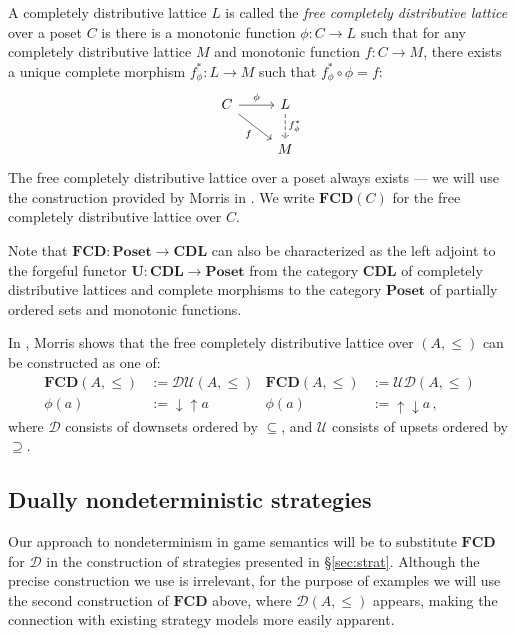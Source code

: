 \documentclass[format=sigplan,authordraft]{acmart}
\begin{document}
A completely distributive lattice $L$ is called the
\emph{free completely distributive lattice}
over a poset $C$ is there is
a monotonic function $\phi : C \rightarrow L$
such that
for any completely distributive lattice $M$
and monotonic function $f : C \rightarrow M$,
there exists a unique complete morphism $f^*_\phi : L \rightarrow M$
such that $f^*_\phi \circ \phi = f$:
\[
  \begin{tikzcd}
    C \arrow[r, "\phi"] \arrow[rd, "f"'] &
    L \arrow[d, "f^*_\phi", dashed] \\ & M
  \end{tikzcd}
\]
The free completely distributive lattice over a poset
always exists ---
we will use the construction provided by
Morris in \cite{augtyp}.
We write $\mathbf{FCD}(C)$ for
the free completely distributive lattice over $C$.

Note that $\mathbf{FCD} : \mathbf{Poset} \rightarrow \mathbf{CDL}$
can also be characterized as
the left adjoint to the forgeful functor
$\mathbf{U} : \mathbf{CDL} \rightarrow \mathbf{Poset}$
from the category $\mathbf{CDL}$
of completely distributive lattices and complete morphisms
to the category $\mathbf{Poset}$
of partially ordered sets and monotonic functions.

In \cite{augtyp}, Morris shows that
the free completely distributive lattice over $(A, \le)$
can be constructed as one of:
\begin{align*}
  \mathbf{FCD}(A, {\le}) &:= \mathcal{D} \mathcal{U}(A, {\le}) &
  \mathbf{FCD}(A, {\le}) &:= \mathcal{U} \mathcal{D}(A, {\le}) \\
  \phi(a) &:= {\downarrow}{\uparrow} a &
  \phi(a) &:= {\uparrow}{\downarrow} a \,,
\end{align*}
where $\mathcal{D}$ consists of
downsets ordered by $\subseteq$,
and $\mathcal{U}$ consists of
upsets ordered by $\supseteq$.


\subsection{Dually nondeterministic strategies} %

Our approach to nondeterminism in game semantics
will be to substitute $\mathbf{FCD}$ for $\mathcal{D}$
in the construction of strategies presented in \S\ref{sec:strat}.
Although the precise construction we use is irrelevant,
for the purpose of examples
we will use the second construction of $\mathbf{FCD}$ above,
where $\mathcal{D}(A, {\le})$ appears,
making the connection with existing strategy models
more easily apparent.
\end{document}
